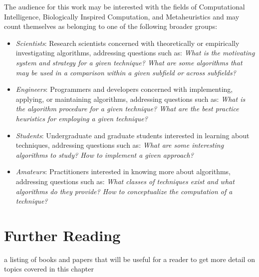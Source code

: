 The audience for this work may be interested with the fields of Computational Intelligence, Biologically Inspired Computation, and Metaheuristics and may count themselves as belonging to one of the following broader groups:

\begin{itemize}
	\item \emph{Scientists}: Research scientists concerned with theoretically or empirically investigating algorithms, addressing questions such as: \emph{What is the motivating system and strategy for a given technique? What are some algorithms that may be used in a comparison within a given subfield or across subfields?}
	\item \emph{Engineers}: Programmers and developers concerned with implementing, applying, or maintaining algorithms, addressing questions such as: \emph{What is the algorithm procedure for a given technique? What are the best practice heuristics for employing a given technique?}
	\item \emph{Students}: Undergraduate and graduate students interested in learning about techniques, addressing questions such as: \emph{What are some interesting algorithms to study? How to implement a given approach?}
	\item \emph{Amateurs}: Practitioners interested in knowing more about algorithms, addressing questions such as: \emph{What classes of techniques exist and what algorithms do they provide? How to conceptualize the computation of a technique?}
\end{itemize}


% 
% 
\section{Further Reading}
\label{intro:sec:further_reading}

a listing of books and papers that will be useful for a reader to get more detail on topics covered in this chapter

